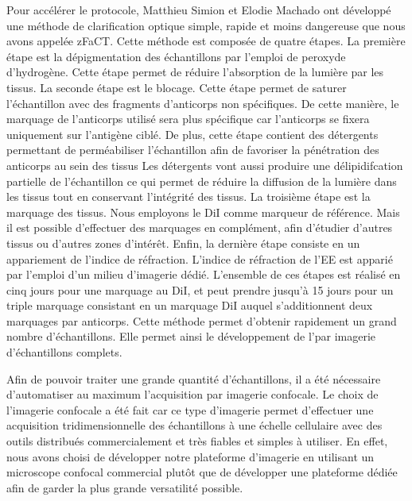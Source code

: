 \documentclass[\main/main.tex]{subfiles}
\begin{document}
%
Pour accélérer le protocole, Matthieu Simion et Elodie Machado ont développé une méthode de clarification optique simple, rapide et moins dangereuse que nous avons appelée zFaCT.
%
Cette méthode est composée de quatre étapes.
%
La première étape est la dépigmentation des échantillons
par l'emploi de peroxyde d'hydrogène.
%
Cette étape permet de réduire l'absorption de la lumière par les tissus.
%
La seconde étape est le blocage.
%
Cette étape permet de saturer l'échantillon avec des fragments d'anticorps non spécifiques.
%
De cette manière, le marquage de l'anticorps utilisé sera plus spécifique
 car l'anticorps se fixera uniquement sur l'antigène ciblé.
%
De plus, cette étape contient des détergents permettant de perméabiliser l'échantillon
afin de favoriser la pénétration des anticorps au sein des tissus
%
Les détergents vont aussi produire une délipidifcation partielle de l'échantillon
ce qui permet de réduire la diffusion de la lumière dans les tissus
tout en conservant l'intégrité des tissus.
%
La troisième étape est la marquage des tissus.
%
Nous employons le DiI comme marqueur de référence.
%
Mais il est possible d'effectuer des marquages \ihc{} en complément, afin d'étudier d'autres tissus ou d'autres zones d'intérêt.
%
Enfin, la dernière étape consiste en un appariement de l'indice de réfraction.
%
L'indice de réfraction de l'EE est apparié
par l'emploi d'un milieu d'imagerie dédié.
%
L'ensemble de ces étapes est réalisé en cinq jours pour une marquage au DiI, et peut prendre jusqu'à 15 jours pour un triple marquage consistant en un marquage DiI auquel s'additionnent deux marquages par anticorps.
%
Cette méthode permet d'obtenir rapidement un grand nombre d'échantillons.
%
Elle permet ainsi le développement de l'\hta par imagerie d'échantillons complets.

%
Afin de pouvoir traiter une grande quantité d'échantillons,
il a été nécessaire d'automatiser au maximum l'acquisition par imagerie confocale.
%
Le choix de l'imagerie confocale a été fait car ce type d'imagerie permet
d'effectuer une acquisition tridimensionnelle des échantillons à une échelle cellulaire avec des outils distribués commercialement et très fiables et simples à utiliser.
%
En effet, nous avons choisi de développer notre plateforme d'imagerie
en utilisant un microscope confocal commercial plutôt que de développer une
plateforme dédiée afin de garder la plus grande versatilité possible.
\end{document}
